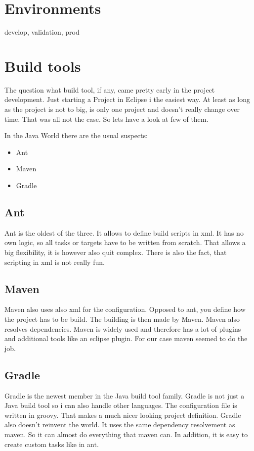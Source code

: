 \documentclass[paper=a4,twoside=false,BCOR=0mm,DIV=calc,fontsize=12pt]{scrartcl}
\begin{document}
\section{Environments}
develop, validation, prod

\section{Build tools}
The question what build tool, if any, came pretty early in the project development. Just starting a Project in Eclipse i the easiest way. 
At least as long as the project is not to big, is only one project and doesn't really change over time. That was all not the case. So lets have a look at few of them. 

In the Java World there are the usual suspects:
\begin{itemize}
 \item Ant
 \item Maven
 \item Gradle
\end{itemize}

\subsection{Ant}
Ant is the oldest of the three. It allows to define build scripts in xml. 
It has no own logic, so all tasks or targets have to be written from scratch.
That allows a big flexibility, it is however also quit complex. There is also the fact,
that scripting in xml is not really fun.


\subsection{Maven}
Maven also uses also xml for the configuration. Opposed to ant, you define how the project has to be build. The building is then
made by Maven. Maven also resolves dependencies. Maven is widely used and therefore has a lot of plugins and additional tools like an eclipse plugin. For our case maven seemed to do the job.


\subsection{Gradle}
Gradle is the newest member in the Java build tool family. Gradle is not just a Java build tool so i can also handle other languages. The configuration file is written in groovy. That makes a much nicer looking project definition.
Gradle also doesn't reinvent the world. It uses the same dependency resolvement as maven. So it can almost do everything that maven can. In addition, it is easy to create custom tasks like in ant.
\end{document}
